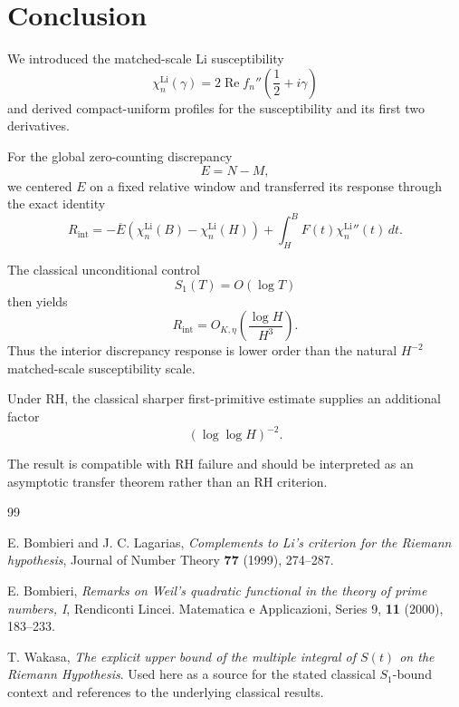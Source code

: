 \documentclass[11pt]{article}
\newcommand{\LiSus}{\chi^{\mathrm{Li}}}
\newcommand{\Rint}{R_{\mathrm{int}}}
\newcommand{\Ebar}{\overline E}
\begin{document}
\section{Conclusion}

We introduced the matched-scale Li susceptibility
\[
\LiSus_n(\gamma)
=
2\operatorname{Re}
f_n''
\left(
\frac12+i\gamma
\right)
\]
and derived compact-uniform profiles for the susceptibility and its
first two derivatives.

For the global zero-counting discrepancy
\[
E=N-M,
\]
we centered \(E\) on a fixed relative window and transferred its
response through the exact identity
\[
\Rint
=
-\Ebar
\left(
\LiSus_n(B)-\LiSus_n(H)
\right)
+
\int_H^B
F(t)\LiSus_n''(t)\,dt.
\]

The classical unconditional control
\[
S_1(T)=O(\log T)
\]
then yields
\[
\Rint
=
O_{K,\eta}
\left(
\frac{\log H}{H^3}
\right).
\]
Thus the interior discrepancy response is lower order than the
natural \(H^{-2}\) matched-scale susceptibility scale.

Under RH, the classical sharper first-primitive estimate supplies an
additional factor
\[
(\log\log H)^{-2}.
\]

The result is compatible with RH failure and should be interpreted as
an asymptotic transfer theorem rather than an RH criterion.

\begin{thebibliography}{99}

E. Bombieri and J. C. Lagarias,
\emph{Complements to Li's criterion for the Riemann hypothesis},
Journal of Number Theory \textbf{77} (1999), 274--287.

E. Bombieri,
\emph{Remarks on Weil's quadratic functional in the theory of prime numbers, I},
Rendiconti Lincei. Matematica e Applicazioni,
Series 9, \textbf{11} (2000), 183--233.

T. Wakasa,
\emph{The explicit upper bound of the multiple integral of \(S(t)\)
on the Riemann Hypothesis}.
Used here as a source for the stated classical \(S_1\)-bound context
and references to the underlying classical results.

\end{thebibliography}
\end{document}
